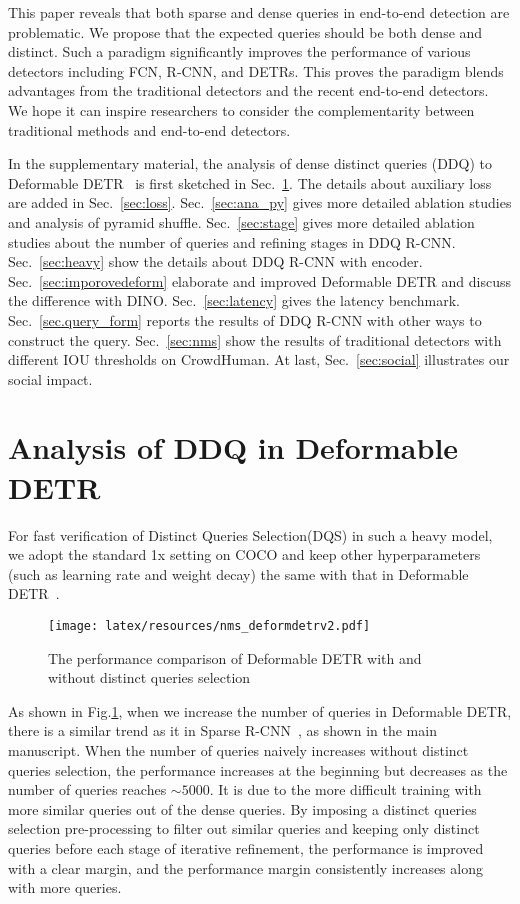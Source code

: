 \documentclass[10pt,twocolumn,letterpaper]{article}
\begin{document}
This paper reveals that both sparse and dense queries in end-to-end detection are problematic. We propose that the expected queries should be both dense and distinct. Such a paradigm significantly improves the performance
of various detectors including FCN, R-CNN, and DETRs. This proves the paradigm blends advantages from the traditional detectors and the recent end-to-end detectors. We hope it can inspire researchers to consider the complementarity between traditional methods and end-to-end detectors.

\clearpage
{\small


}

\clearpage
\appendix
In the supplementary material, the analysis of dense distinct queries (DDQ) to Deformable DETR~\cite{zhu2020deformable} is first sketched in Sec.~\ref{sec:deformable_detr}. The details about auxiliary loss are added in Sec.~\ref{sec:loss}.   Sec.~\ref{sec:ana_py} gives more detailed ablation studies and analysis of pyramid shuffle.  Sec.~\ref{sec:stage} gives more detailed ablation studies about the number of queries and refining stages in DDQ R-CNN.   Sec.~\ref{sec:heavy} show the details about DDQ R-CNN with encoder. Sec.~\ref{sec:imporovedeform} elaborate and improved Deformable DETR and discuss the difference with DINO. Sec.~\ref{sec:latency} gives the latency benchmark.
Sec.~\ref{sec.query_form} reports the results of DDQ R-CNN with other ways to construct the query. Sec.~\ref{sec:nms} show the results of traditional detectors with different IOU thresholds on CrowdHuman. At last, Sec.~\ref{sec:social} illustrates our social impact.

\section{Analysis of DDQ in Deformable DETR}
\label{sec:deformable_detr}
For fast verification of Distinct Queries Selection(DQS) in such a heavy model, we adopt the standard 1x setting on COCO and keep other hyperparameters (such as learning rate and weight decay) the same with that in Deformable DETR~\cite{zhu2020deformable}.
\begin{figure}[!h]
    \centering
    \texttt{[image: latex/resources/nms\_deformdetrv2.pdf]}
    \caption{The performance comparison of Deformable DETR with and without distinct queries selection}
    \label{fig:nms_deform_detr}
\end{figure}

As shown in  Fig.\ref{fig:nms_deform_detr},  when we increase the number of queries in Deformable DETR, there is a similar trend as it in Sparse R-CNN~\cite{sun2021sparse}, as shown in the main manuscript. When the number of queries naively increases without distinct queries selection, the performance increases at the beginning but decreases as the number of queries reaches $\sim5000$. It is due to the more difficult training with more similar queries out of the dense queries. By imposing a distinct queries selection pre-processing to filter out similar queries and keeping only distinct queries before each stage of iterative refinement, the performance is improved with a clear margin, and the performance margin consistently increases along with more queries.
\end{document}
